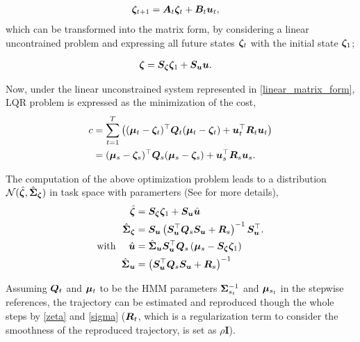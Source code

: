\begin{align}
  \bm{\zeta}_{t+1} &= \bm{A}_t \bm{\zeta}_t + \bm{B}_t \bm{u}_t,
\end{align}
which can be transformed into the matrix form, by considering a linear uncontrained problem and expressing all future states \(\bm{\zeta}_t\) with the initial state \(\bm{\zeta}_1\);

\begin{align}
  \label{equation:linear_matrix_form}
  \bm{\zeta} &= \bm{S}_{\bm{\zeta}} \bm{\zeta}_1 + \bm{S}_{\bm{u}} \bm{u}.
\end{align}

Now, under the linear unconstrained system represented in \eqref{linear_matrix_form}, LQR problem is expressed as the minimization of the cost,
\begin{align}
  \label{equation:cost_function}
  c &= \sum^T_{t=1} \left( (\bm{\mu}_t - \bm{\zeta}_t)^\top \bm{Q}_t (\bm{\mu}_t - \bm{\zeta}_t) + \bm{u}_t^\top \bm{R}_t \bm{u}_t \right) \nonumber \\
    &= (\bm{\mu}_s - \bm{\zeta}_s)^\top \bm{Q}_s (\bm{\mu}_s - \bm{\zeta}_s) + \bm{u}_s^\top \bm{R}_s \bm{u}_s.
\end{align}

The computation of the above optimization problem leads to a distribution \( \mathcal{N}(\hat{\bm{\zeta}}, \hat{\bm{\Sigma}}_{\bm{\zeta}}) \) in task space with paramerters (See \cite{HMM_LQR} for more details),
\begin{align}
  \hat{\bm{\zeta}} &= \bm{S}_{\bm{\zeta}} \bm{\zeta}_1 + \bm{S}_{\bm{u}} \hat{\bm{u}} \label{equation:zeta} \\
  \hat{\bm{\Sigma}}_{\bm{\zeta}} &= \bm{S}_{\bm{u}} \left( \bm{S}_{\bm{u}}^\top \bm{Q}_s \bm{S}_{\bm{u}} + \bm{R}_s \right)^{-1} \bm{S}_{\bm{u}}^\top. \label{equation:sigma} \\
  \mbox{with} \ \ \ \ \hat{\bm{u}} &= \hat{\bm{\Sigma}}_{\bm{u}} \bm{S}_{\bm{u}}^\top \bm{Q}_s \left( \bm{\mu}_s - \bm{S}_{\bm{\zeta}} \bm{\zeta}_1 \right) \nonumber \\
  \hat{\bm{\Sigma}}_{\bm{u}} &= \left( \bm{S}_{\bm{u}}^\top \bm{Q}_s \bm{S}_{\bm{u}} + \bm{R}_s \right)^{-1} \nonumber
\end{align}

Assuming \( \bm{Q}_t \) and \( \bm{\mu}_t \) to be the HMM parameters \( \bm{\Sigma}^{-1}_{s_t} \) and \( \bm{\mu}_{s_t} \) in the stepwise references, the trajectory can be estimated and reproduced though the whole steps by \eqref{zeta} and \eqref{sigma} (\( \bm{R}_t \), which is a regularization term to consider the smoothness of the reproduced trajectory, is set as \( \rho \bm{I} \)).


